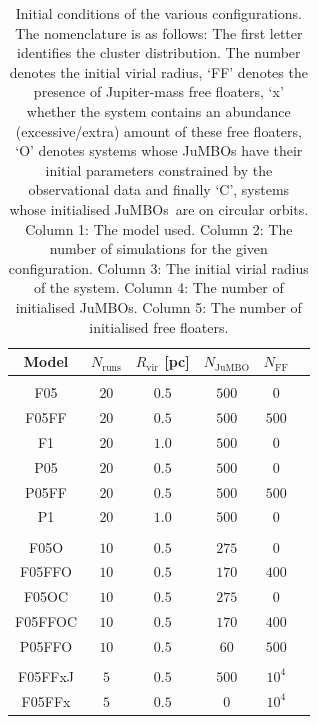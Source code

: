 \documentclass[aa]{lib/aa}
\newcommand{\jumbos}{\mbox{JuMBOs}}
\begin{document}
\begin{table}
  \caption{Initial conditions of the various configurations. The
    nomenclature is as follows: The first letter identifies the
    cluster distribution. The number denotes the initial virial
    radius, `FF' denotes the presence of Jupiter-mass free floaters,
    `x' whether the system contains an abundance (excessive/extra)
    amount of these free floaters, `O' denotes systems whose JuMBOs
    have their initial parameters constrained by the observational
    data and finally `C', systems whose initialised \jumbos\, are on
    circular orbits. Column 1: The model used. Column 2: The number of
    simulations for the given configuration. Column 3: The initial
    virial radius of the system. Column 4: The number of initialised
    JuMBOs. Column 5: The number of initialised free floaters.}
        \label{Tab:SF_FF_Params}
        \centering 
        \begin{tabular}{c c c c c c}
        \hline\hline
        Model & $N_{\mathrm{runs}}$ & $R_{\mathrm{vir}}$ [pc] & $N_{\mathrm{JuMBO}}$ & $N_{\mathrm{FF}}$\\
        \hline \vspace{-0.75em}\\ 
           F05     & $20$ & $0.5$ & $500$ & $0$ \\
           F05FF   & $20$ & $0.5$ & $500$ & $500$ \\
           F1      & $20$ & $1.0$ & $500$ & $0$ \\
           P05     & $20$ & $0.5$ & $500$ & $0$ \\
           P05FF   & $20$ & $0.5$ & $500$ & $500$ \\
           P1      & $20$ & $1.0$ & $500$ & $0$ \\
           \hline
           \hline \vspace{-0.75em}\\
           F05O   & $10$ & $0.5$ & $275$ & $0$ \\
           F05FFO & $10$ & $0.5$ & $170$ & $400$ & \\
           F05OC   & $10$ & $0.5$ & $275$ & $0$ \\
           F05FFOC & $10$ & $0.5$ & $170$ & $400$ & \\
           P05FFO   & $10$ & $0.5$ & $60$  & $500$ \\
           \hline
           \hline \vspace{-0.75em}\\
           F05FFxJ & $5$ & $0.5$ & $500$ & $10^{4}$ \\
           F05FFx  & $5$ & $0.5$ & $0$   & $10^{4}$\\
         \hline                                   %
        \end{tabular}
     \end{table}
\end{document}
